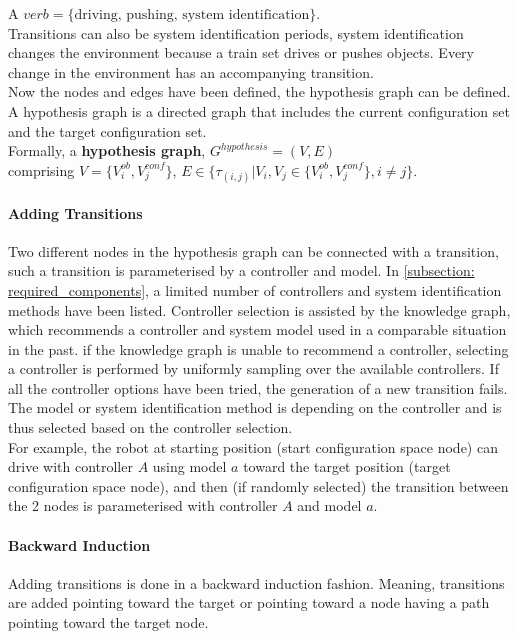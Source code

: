 A $verb = \{\textrm{driving, pushing, system identification}\}$.\\

Transitions can also be system identification periods, system identification changes the environment because a train set drives or pushes objects. Every change in the environment has an accompanying transition.\\

Now the nodes and edges have been defined, the hypothesis graph can be defined. A hypothesis graph is a directed graph that includes the current configuration set and the target configuration set. \\
Formally, a \textbf{hypothesis graph}, $G^{hypothesis} = (V, E)$ 
\\comprising $V = \{V^{ob}_{i}, V^{conf}_{j}\}$, $E \in \{\tau_{(i,j)}| V_i, V_j \in \{V^{ob}_{i}, V^{conf}_{j}\}, i \neq j\}$.\\


\paragraph{Adding Transitions}
Two different nodes in the hypothesis graph can be connected with a transition, such a transition is parameterised by a controller and model. In \cref{subsection: required_components}, a limited number of controllers and system identification methods have been listed. Controller selection is assisted by the knowledge graph, which recommends a controller and system model used in a comparable situation in the past. if the knowledge graph is unable to recommend a controller, selecting a controller is performed by uniformly sampling over the available controllers. If all the controller options have been tried, the generation of a new transition fails. The model or system identification method is depending on the controller and is thus selected based on the controller selection. \\

For example, the robot at starting position (start configuration space node) can drive with controller $A$ using model $a$ toward the target position (target configuration space node), and then (if randomly selected) the transition between the 2 nodes is parameterised with controller $A$ and model $a$. \\

\paragraph{Backward Induction} Adding transitions is done in a backward induction fashion. Meaning, transitions are added pointing toward the target or pointing toward a node having a path pointing toward the target node. \\

